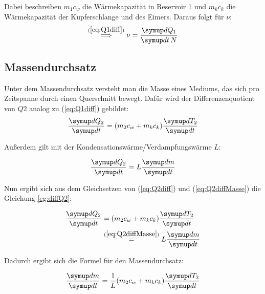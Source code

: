 Dabei beschreiben $m_{1} c_{w}$ die Wärmekapazität in Reservoir 1 und $m_{k} c_{k}$ die Wärmekapazität der Kupferschlange und des Eimers.
Daraus folgt für $\nu$:
\begin{equation} \label{eq:emp_nu}
    \stackrel{(\ref{eq:Q1diff})}{\implies} \nu = \frac{\dif{Q_{1}}}{\dif{t} N}
\end{equation}


\subsection{Massendurchsatz}

Unter dem Massendurchsatz versteht man die Masse eines Mediums, das sich pro Zeitspanne durch einen Querschnitt bewegt.
Dafür wird der Differenzenquotient von $Q{2}$ analog zu (\ref{eq:Q1diff}) gebildet:
\begin{equation} \label{eq:Q2diff}
    \frac{\dif{Q_{2}}}{\dif{t}} = (m_{2} c_{w} + m_{k} c_{k}) \frac{\dif{T_{2}}}{\dif{t}}
\end{equation}

Außerdem gilt mit der Kondensationswärme/Verdampfungswärme $L$:

\begin{equation} \label{eq:Q2diffMasse}
    \frac{\dif{Q_{2}}}{\dif{t}} = L \frac{\dif{m}}{\dif{t}}
\end{equation}

Nun ergibt sich aus dem Gleichsetzen von (\ref{eq:Q2diff}) und (\ref{eq:Q2diffMasse}) die Gleichung \ref{eg:diffQ2}:

\begin{align} \label{eg:diffQ2}
    \begin{split}
        \frac{\dif{Q_{2}}}{\dif{t}} & = (m_{2} c_{w} + m_{k} c_{k}) \frac{\dif{T_{2}}}{\dif{t}} \\
            & \stackrel{(\ref{eq:Q2diffMasse})}{=} L \frac{\dif{m}}{\dif{t}}
    \end{split}
\end{align}

Dadurch ergibt sich die Formel für den Massendurchsatz:

\begin{equation} \label{eq:massendurchsatz}
    \frac{\dif{m}}{\dif{t}} = \frac{1}{L} (m_{2} c_{w} + m_{k} c_{k}) \frac{\dif{T_{2}}}{\dif{t}}
\end{equation}


